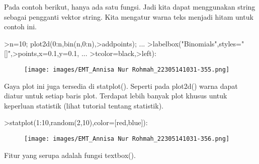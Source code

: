 \documentclass[a4paper,10pt]{article}
\begin{document}
\begin{eulernotebook}
\begin{eulercomment}
Pada contoh berikut, hanya ada satu fungsi. Jadi kita dapat
menggunakan string sebagai pengganti vektor string. Kita mengatur
warna teks menjadi hitam untuk contoh ini.
\end{eulercomment}
\begin{eulerprompt}
>n=10; plot2d(0:n,bin(n,0:n),>addpoints); ...
>labelbox("Binomials",styles="[]",>points,x=0.1,y=0.1, ...
>tcolor=black,>left):
\end{eulerprompt}
\begin{figure}[h]
    \centering
    \texttt{[image: images/EMT\_Annisa Nur Rohmah\_22305141031-355.png]}
\end{figure}
\begin{eulercomment}
Gaya plot ini juga tersedia di statplot(). Seperti pada plot2d() warna
dapat diatur untuk setiap baris plot. Terdapat lebih banyak plot
khusus untuk keperluan statistik (lihat tutorial tentang statistik).
\end{eulercomment}
\begin{eulerprompt}
>statplot(1:10,random(2,10),color=[red,blue]):
\end{eulerprompt}
\begin{figure}[h]
    \centering
    \texttt{[image: images/EMT\_Annisa Nur Rohmah\_22305141031-356.png]}
\end{figure}
\begin{eulercomment}
Fitur yang serupa adalah fungsi textbox().


\end{eulercomment}
\end{eulernotebook}
\end{document}

